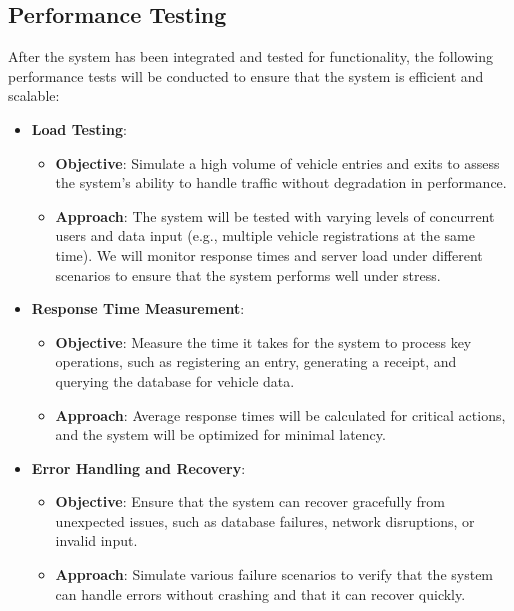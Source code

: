 \subsection{Performance Testing}

After the system has been integrated and tested for functionality, the following performance tests will be conducted to ensure that the system is efficient and scalable:

\begin{itemize}
    \item \textbf{Load Testing}:
    \begin{itemize}
        \item \textbf{Objective}: Simulate a high volume of vehicle entries and exits to assess the system’s ability to handle traffic without degradation in performance.
        \item \textbf{Approach}: The system will be tested with varying levels of concurrent users and data input (e.g., multiple vehicle registrations at the same time). We will monitor response times and server load under different scenarios to ensure that the system performs well under stress.
    \end{itemize}

    \item \textbf{Response Time Measurement}:
    \begin{itemize}
        \item \textbf{Objective}: Measure the time it takes for the system to process key operations, such as registering an entry, generating a receipt, and querying the database for vehicle data.
        \item \textbf{Approach}: Average response times will be calculated for critical actions, and the system will be optimized for minimal latency.
    \end{itemize}

    \item \textbf{Error Handling and Recovery}:
    \begin{itemize}
        \item \textbf{Objective}: Ensure that the system can recover gracefully from unexpected issues, such as database failures, network disruptions, or invalid input.
        \item \textbf{Approach}: Simulate various failure scenarios to verify that the system can handle errors without crashing and that it can recover quickly.
    \end{itemize}
\end{itemize}

